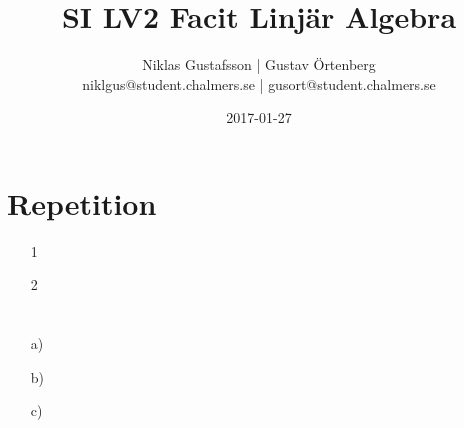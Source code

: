 \documentclass{article}
\title{SI LV2 Facit Linjär Algebra}
\author{Niklas Gustafsson | Gustav Örtenberg  \\ \small{niklgus@student.chalmers.se} | \small{gusort@student.chalmers.se}}
\date{2017-01-27}
\begin{document}
\maketitle
\section*{Repetition}
\begin{itemize}
	\item[1] 
	\item[2] 
\end{itemize}

\section{}


\section{}
\begin{itemize}
	\item[a) ] 
	\item[b) ] 
	\item[c) ] 
\end{itemize}

\section{}


\section{}


\section{}


\section{}

\end{document}
